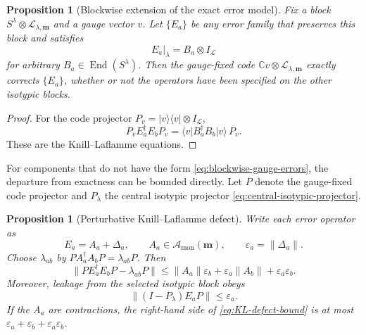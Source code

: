 \documentclass[11pt]{article}
\newtheorem{proposition}[theorem]{Proposition}
\theoremstyle{definition}
\theoremstyle{remark}
\newcommand{\C}{\mathbb C}
\newcommand{\cA}{\mathcal A}
\newcommand{\cL}{\mathcal L}
\newcommand{\End}{\operatorname{End}}
\newcommand{\ket}[1]{\lvert #1\rangle}
\newcommand{\bra}[1]{\langle #1\rvert}
\newcommand{\proj}[1]{\lvert #1\rangle\!\langle #1\rvert}
\begin{document}
\begin{proposition}[Blockwise extension of the exact error model]\label{prop:blockwise-extension}
Fix a block $S^\lambda\otimes\cL_{\lambda,\boldsymbol m}$ and a gauge vector $v$.  Let $\{E_a\}$ be any error family that preserves this block and satisfies
\begin{equation}\label{eq:blockwise-gauge-errors}
 E_a\big|_\lambda=B_a\otimes I_{\cL}
\end{equation}
for arbitrary $B_a\in\End(S^\lambda)$.  Then the gauge-fixed code $\C v\otimes\cL_{\lambda,\boldsymbol m}$ exactly corrects $\{E_a\}$, whether or not the operators have been specified on the other isotypic blocks.
\end{proposition}

\begin{proof}
For the code projector $P_v=\proj v\otimes I_{\cL}$,
\[
 P_vE_a^\dagger E_bP_v
 =\bra vB_a^\dagger B_b\ket v\,P_v.
\]
These are the Knill--Laflamme equations.
\end{proof}

For components that do not have the form \eqref{eq:blockwise-gauge-errors}, the departure from exactness can be bounded directly.  Let $P$ denote the gauge-fixed code projector and $P_\lambda$ the central isotypic projector \eqref{eq:central-isotypic-projector}.

\begin{proposition}[Perturbative Knill--Laflamme defect]\label{prop:perturbative-KL}
Write each error operator as
\begin{equation}\label{eq:error-perturbation}
 E_a=A_a+\Delta_a,
 \qquad A_a\in\cA_{\mathrm{mon}}(\boldsymbol m),
 \qquad \varepsilon_a=\|\Delta_a\|.
\end{equation}
Choose $\lambda_{ab}$ by $PA_a^\dagger A_bP=\lambda_{ab}P$.  Then
\begin{equation}\label{eq:KL-defect-bound}
 \big\|PE_a^\dagger E_bP-\lambda_{ab}P\big\|
 \leq
 \|A_a\|\varepsilon_b
 +\varepsilon_a\|A_b\|
 +\varepsilon_a\varepsilon_b.
\end{equation}
Moreover, leakage from the selected isotypic block obeys
\begin{equation}\label{eq:isotypic-leakage-bound}
 \|(I-P_\lambda)E_aP\|\leq\varepsilon_a.
\end{equation}
If the $A_a$ are contractions, the right-hand side of \eqref{eq:KL-defect-bound} is at most $\varepsilon_a+\varepsilon_b+\varepsilon_a\varepsilon_b$.
\end{proposition}
\end{document}
